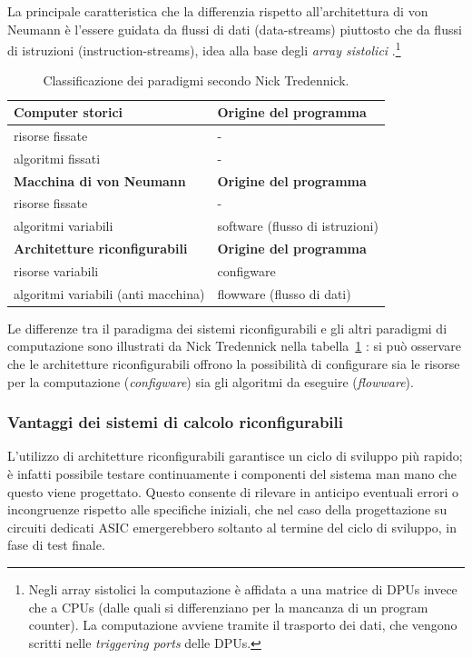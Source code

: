 La principale caratteristica che la differenzia rispetto all'architettura di von Neumann è
l'essere guidata da flussi di dati (data-streams) piuttosto che da flussi di istruzioni
(instruction-streams), idea alla base degli \emph{array sistolici}
\cite{SystolicArraysConceptImplementation}.\footnote{Negli array
sistolici la computazione è affidata a una matrice di \acp{DPU} invece che a \acsp{CPU}
(dalle quali si differenziano per la mancanza di un program counter). La computazione
avviene tramite il trasporto dei dati, che vengono scritti nelle \emph{triggering ports}
delle \acp{DPU}.}



\begin{table}[ht]
\begin{center}
 \begin{tabular}{l | l}
 \hline
 \textbf{Computer storici} & \textbf{Origine del programma}\\
 \hline
 risorse fissate & -\\
 algoritmi fissati & -\\
 \hline
 \textbf{Macchina di von Neumann} & \textbf{Origine del programma}\\
 \hline
 risorse fissate & -\\
 algoritmi variabili & software (flusso di istruzioni)\\
 \hline
 \textbf{Architetture riconfigurabili} & \textbf{Origine del programma}\\
 \hline
 risorse variabili & configware\\
 algoritmi variabili (anti macchina) & flowware (flusso di dati)
 \end{tabular}
 \caption{Classificazione dei paradigmi secondo Nick Tredennick.}
 \label{tab:TredennickClassificationScheme}
 \end{center}
\end{table}

Le differenze tra il paradigma dei sistemi riconfigurabili e gli altri paradigmi di
computazione sono illustrati da Nick Tredennick nella
tabella~\ref{tab:TredennickClassificationScheme} \cite{TredennickClassification}: si può
osservare che le architetture riconfigurabili offrono la possibilità di configurare sia le
risorse per la computazione (\emph{configware}) sia gli algoritmi da eseguire
(\emph{flowware}). 

\subsubsection{Vantaggi dei sistemi di calcolo riconfigurabili}
L'utilizzo di architetture riconfigurabili garantisce un ciclo di sviluppo pi\`u rapido;
\`e infatti possibile testare continuamente i componenti del sistema man mano che questo viene
progettato. Questo consente di rilevare in anticipo eventuali errori o incongruenze rispetto alle
specifiche iniziali, che nel caso della progettazione su circuiti dedicati \ac{ASIC} emergerebbero
soltanto al termine del ciclo di sviluppo, in fase di test finale.


